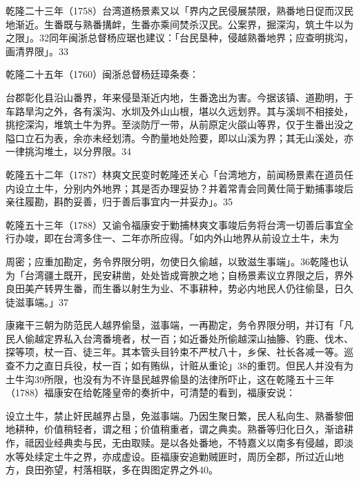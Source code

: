 乾隆二十三年（1758）台湾道杨景素又以「界内之民侵展禁限，熟番地日促而汉民地渐近。生番既与熟番搆衅，生番亦乘间焚杀汉民。公案界，掘深沟，筑土牛以为之限」。32同年闽浙总督杨应琚也建议：「台民垦种，侵越熟番地界；应查明挑沟，画清界限」。33

乾隆二十五年（1760）闽浙总督杨廷璋条奏：

\begin{BookQuote}
台郡彰化县沿山番界，年来侵垦渐近内地，生番逸出为害。今据该镇、道勘明，于车路旱沟之外，各有溪沟、水圳及外山山根，堪以久远划界。其与溪圳不相接处，挑挖深沟，堆筑土牛为界。至淡防厅一带，从前原定火燄山等界，仅于生番出没之隘口立石为表，余亦未经划清。今酌量地处险要，即以山溪为界；其无山溪处，亦一律挑沟堆土，以分界限。34
\end{BookQuote}

乾隆五十二年（1787）林爽文民变时乾隆还关心「台湾地方，前闻杨景素在道员任内设立土牛，分别内外地界；其是否办理妥协？并着常青会同黄仕简于勦捕事竣后亲往履勘，斟酌妥善，归于善后事宜内一并妥办」。35

乾隆五十三年（1788）又谕令福康安于勦捕林爽文事竣后务将台湾一切善后事宜全行办竣，即在台湾多住一、二年亦所应得。「如内外山地界从前设立土牛，未为

\vfill
\begin{BookNotes}
\end{BookNotes}

\noindent 周密；应重加勘定，务令界限分明，勿使日久偷越，以致滋生事端」。36乾隆也认为「台湾疆土既开，民安耕凿，处处皆成膏腴之地；自杨景素议立界限之后，界外良田美产转畀生番，而生番以射生为业、不事耕种，势必内地民人仍往偷垦，日久徒滋事端。」37

康雍干三朝为防范民人越界偷垦，滋事端，一再勘定，务令界限分明，并订有「凡民人偷越定界私入台湾番境者，杖一百；如近番处所偷越深山抽籐、钓鹿、伐木、探等项，杖一百、徒三年。其本管头目钤束不严杖八十，乡保、社长各减一等。巡查不力之直日兵役，杖一百；如有贿纵，计赃从重论」38的重罚。但民人并没有为土牛沟39所限，也没有为不许垦民越界偷垦的法律所吓止，这在乾隆五十三年（1788）福康安在给乾隆皇帝的奏折中，可清楚的看到，福康安说：

\begin{BookQuote}
设立土牛，禁止奸民越界占垦，免滋事端。乃因生聚日繁，民人私向生、熟番黎佃地耕种，价值稍轻者，谓之租；价值稍重者，谓之典卖。熟番等归化日久，渐谙耕作，祗因业经典卖与民，无由取赎。是以各处番地，不特嘉义以南多有侵越，即淡水等处续定土牛之界，亦成虚设。臣福康安追勦贼匪时，周历全郡，所过近山地方，良田弥望，村落相联，多在舆图定界之外40。
\end{BookQuote}


